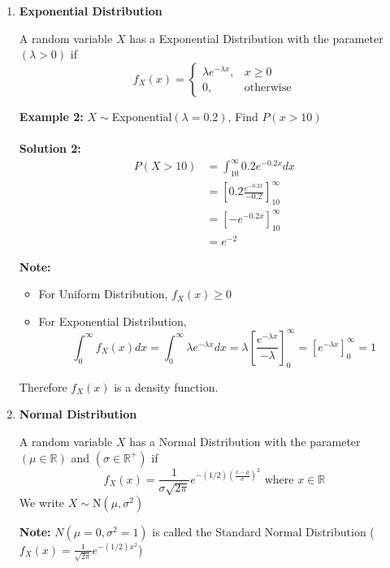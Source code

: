 \documentclass[12pt, twoside]{article}
\begin{document}
\begin{enumerate}
	\item{
	
	\textbf{Exponential Distribution}
	
	\begin{tcolorbox}[title=Defintion: Exponential Distribution]
		A random variable $X$ has a Exponential Distribution with the parameter $(\lambda > 0)$ if 
		$$f_X (x) = \begin{cases}
		\lambda e^{-\lambda x} , & x \geq 0\\
		0 , & \text{otherwise}
		\end{cases}$$
	\end{tcolorbox}
	
	\textbf{Example 2:} $X \sim $Exponential$(\lambda = 0.2)$, Find $P(x > 10)$\\
	\\
	\textbf{Solution 2:}
	\begin{align*}
		P(X > 10) &= \int^{\infty}_{10} 0.2e^{-0.2x} dx\\
		&= [0.2 \frac{e^{-0.2x}}{-0.2}]^{\infty}_{10}\\
		&= [ -e^{-0.2x}]^{\infty}_{10}\\
		&= e^{-2}
	\end{align*}
	
	\textbf{Note:}
	\begin{itemize}
		\item{For Uniform Distribution, $f_X (x) \geq 0$}
		\item{For Exponential Distribution, $$\int^{\infty}_{0} f_X (x) dx = \int^{\infty}_{0} \lambda e^{-\lambda x} dx = \lambda [\frac{e^{-\lambda x}}{-\lambda}]^{\infty}_{0} = [e^{-\lambda x}]^{\infty}_{0} = 1$$}
	\end{itemize}

	Therefore $f_X (x)$ is a density function.
	
	}
	\item{
	\textbf{Normal Distribution}
	
	\begin{tcolorbox}[title=Defintion: Normal Distribution]
		A random variable $X$ has a Normal Distribution with the parameter $(\mu \in\mathbb{R})$ and $(\sigma \in\mathbb{R}^{+})$ if 
		$$f_X (x) = \frac{1}{\sigma \sqrt{2\pi}} e^{-(1/2)(\frac{x - \mu}{\sigma})^2} \text{ where } x\in\mathbb{R}$$
		We write $X \sim $N$(\mu, \sigma^2 )$
	\end{tcolorbox}
	
	\textbf{Note:} $N(\mu = 0, \sigma^2 = 1)$ is called the Standard Normal Distribution ($f_X (x) = \frac{1}{\sqrt{2\pi}} e^{-(1/2)x^2}$)
	
}
\end{enumerate}
\end{document}

